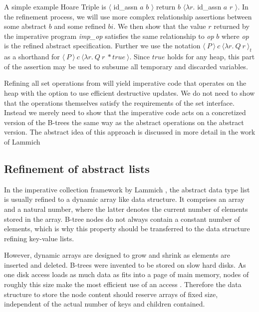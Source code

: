 A simple example Hoare Triple is 
$\langle$ id\_assn $a$ $b$ $\rangle$ return $b$ $\langle \lambda r.$ id\_assn $a$ $r$ $\rangle$.
In the refinement process, we will use more complex relationship assertions
between some abstract $b$ and some refined $bi$.
We then show that the value $r$ returned
by the imperative program \textit{imp\_op} satisfies the same relationship
to \textit{op} $b$ where \textit{op} is the refined abstract specification.
Further we use the notation $\langle\ P\ \rangle\ c\ \langle \lambda r.\ Q\ r\ \rangle_t$
as a shorthand for $\langle\ P\ \rangle\ c\ \langle \lambda r.\ Q\ r\ * true\ \rangle$.
Since $true$ holds for any heap, this part of the assertion
may be used to subsume all temporary and discarded variables.

Refining all set operations from 
will yield imperative code that operates on the heap
with the  option to use efficient destructive updates.
We do not need to show that the operations themselves
satisfy the requirements of the set interface.
Instead we merely need to show that the imperative code
acts on a concretized version of the B-trees
the same way as the abstract operations on the abstract version.
The abstract idea of this approach is discussed in more detail
in the work of Lammich \parencite{DBLP:journals/jar/Lammich19}


\subsection{Refinement of abstract lists}

In the imperative collection framework by Lammich
\parencite{DBLP:journals/jar/Lammich19},
the abstract data type list is usually
refined to a dynamic array like data structure.
It comprises an array and a natural number,
where the latter denotes the current number of elements
stored in the array.
B-tree nodes do not always contain a constant number of elements,
which is why this property should be transferred to
the data structure refining key-value lists. 

However, dynamic arrays are designed to grow and shrink
as elements are inserted and deleted.
B-trees were invented to be stored on slow hard disks.
As one disk access loads as much data as fits into a page of main memory,
nodes of roughly this size make the most efficient use of an access
\parencite{DBLP:journals/acta/BayerM72}.
Therefore the data structure to store the node content
should reserve arrays of fixed size, independent
of the actual number of keys and children contained.


